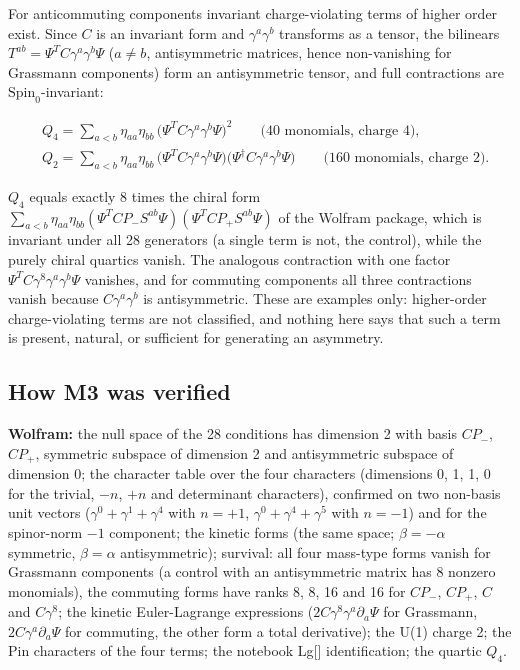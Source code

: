 \documentclass[11pt]{article}
\begin{document}
For anticommuting components invariant charge-violating terms of higher order exist. Since $C$ is an invariant form and $\gamma^a\gamma^b$ transforms as a tensor, the bilinears $T^{ab}=\Psi^TC\gamma^a\gamma^b\Psi$ ($a\ne b$, antisymmetric matrices, hence non-vanishing for Grassmann components) form an antisymmetric tensor, and full contractions are $\mathrm{Spin}_0$-invariant:

\[
\begin{aligned}
&Q_4=\sum_{a<b}\eta_{aa}\eta_{bb}\,\bigl(\Psi^TC\gamma^a\gamma^b\Psi\bigr)^2 \qquad\text{(40 monomials, charge 4)},\\
&Q_2=\sum_{a<b}\eta_{aa}\eta_{bb}\,\bigl(\Psi^TC\gamma^a\gamma^b\Psi\bigr)\bigl(\Psi^\dagger C\gamma^a\gamma^b\Psi\bigr)\qquad\text{(160 monomials, charge 2)}.
\end{aligned}
\]

$Q_4$ equals exactly 8 times the chiral form $\sum_{a<b}\eta_{aa}\eta_{bb}(\Psi^TCP_-S^{ab}\Psi)(\Psi^TCP_+S^{ab}\Psi)$ of the Wolfram package, which is invariant under all 28 generators (a single term is not, the control), while the purely chiral quartics vanish. The analogous contraction with one factor $\Psi^TC\gamma^8\gamma^a\gamma^b\Psi$ vanishes, and for commuting components all three contractions vanish because $C\gamma^a\gamma^b$ is antisymmetric. These are examples only: higher-order charge-violating terms are not classified, and nothing here says that such a term is present, natural, or sufficient for generating an asymmetry.

\subsection{How M3 was verified}

\textbf{Wolfram:} the null space of the 28 conditions has dimension 2 with basis $CP_-$, $CP_+$, symmetric subspace of dimension 2 and antisymmetric subspace of dimension 0; the character table over the four characters (dimensions 0, 1, 1, 0 for the trivial, $-n$, $+n$ and determinant characters), confirmed on two non-basis unit vectors ($\gamma^0+\gamma^1+\gamma^4$ with $n=+1$, $\gamma^0+\gamma^4+\gamma^5$ with $n=-1$) and for the spinor-norm $-1$ component; the kinetic forms (the same space; $\beta=-\alpha$ symmetric, $\beta=\alpha$ antisymmetric); survival: all four mass-type forms vanish for Grassmann components (a control with an antisymmetric matrix has 8 nonzero monomials), the commuting forms have ranks 8, 8, 16 and 16 for $CP_-$, $CP_+$, $C$ and $C\gamma^8$; the kinetic Euler-Lagrange expressions ($2C\gamma^8\gamma^a\partial_a\Psi$ for Grassmann, $2C\gamma^a\partial_a\Psi$ for commuting, the other form a total derivative); the U(1) charge 2; the Pin characters of the four terms; the notebook Lg[] identification; the quartic $Q_4$.
\end{document}
